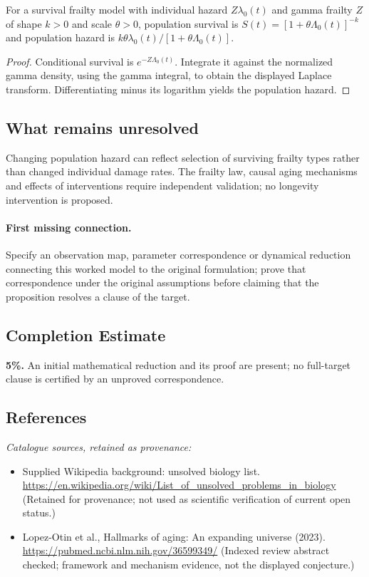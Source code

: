\documentclass[11pt]{article}
\begin{document}
\begin{proposition}
For a survival frailty model with individual hazard $Z\lambda_0(t)$ and gamma frailty $Z$ of shape $k>0$ and scale $\theta>0$, population survival is $S(t)=[1+\theta\Lambda_0(t)]^{-k}$ and population hazard is $k\theta\lambda_0(t)/[1+\theta\Lambda_0(t)]$.
\end{proposition}
\begin{proof}
Conditional survival is $e^{-Z\Lambda_0(t)}$. Integrate it against the normalized gamma density, using the gamma integral, to obtain the displayed Laplace transform. Differentiating minus its logarithm yields the population hazard.
\end{proof}
\subsection{What remains unresolved}
Changing population hazard can reflect selection of surviving frailty types rather than changed individual damage rates. The frailty law, causal aging mechanisms and effects of interventions require independent validation; no longevity intervention is proposed.
\paragraph{First missing connection.} Specify an observation map, parameter correspondence or dynamical reduction connecting this worked model to the original formulation; prove that correspondence under the original assumptions before claiming that the proposition resolves a clause of the target.
\subsection{Completion Estimate}
\textbf{5\%.} An initial mathematical reduction and its proof are present; no full-target clause is certified by an unproved correspondence.
\subsection{References}
\noindent\emph{Catalogue sources, retained as provenance:}
\begin{itemize}
\item Supplied Wikipedia background: unsolved biology list. \url{https://en.wikipedia.org/wiki/List_of_unsolved_problems_in_biology} (Retained for provenance; not used as scientific verification of current open status.)
\item Lopez-Otin et al., Hallmarks of aging: An expanding universe (2023). \url{https://pubmed.ncbi.nlm.nih.gov/36599349/} (Indexed review abstract checked; framework and mechanism evidence, not the displayed conjecture.)
\end{itemize}
\end{document}
